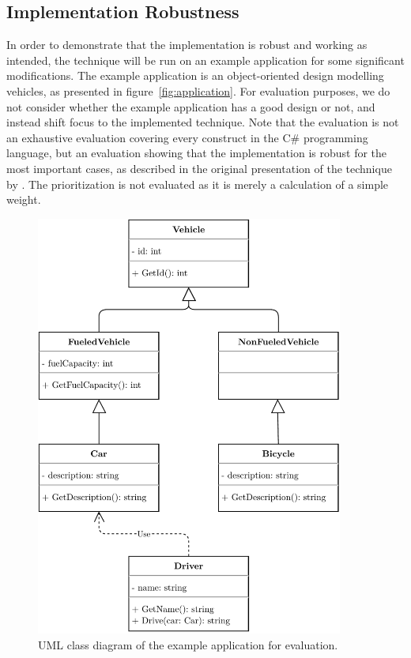 \documentclass[a4paper,english,12pt]{report}
\begin{document}
\subsection{Implementation Robustness}\label{sec:implementation-robustness}
In order to demonstrate that the implementation is robust and working as intended, the technique will be run on an example application for some significant modifications. The example application is an object-oriented design modelling vehicles, as presented in figure~\vref{fig:application}. For evaluation purposes, we do not consider whether the example application has a good design or not, and instead shift focus to the implemented technique. Note that the evaluation is not an exhaustive evaluation covering every construct in the C\# programming language, but an evaluation showing that the implementation is robust for the most important cases, as described in the original presentation of the technique by \citet{mansour2009regression}. The prioritization is not evaluated as it is merely a calculation of a simple weight.

\begin{figure}[htbp]
  \centering
  \includegraphics[width=0.9\textwidth]{includes/figures/application}
  \caption{UML class diagram of the example application for evaluation.}
  \label{fig:application}
\end{figure}
\end{document}
